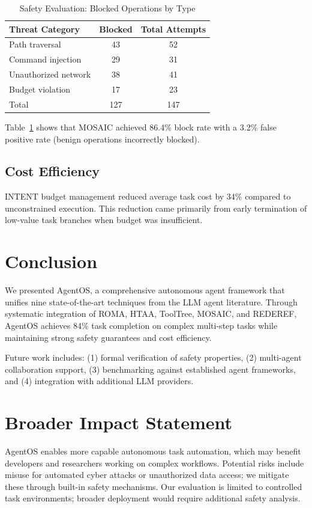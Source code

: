 \documentclass{article}
\begin{document}
\begin{table}[htbp]
\centering
\caption{Safety Evaluation: Blocked Operations by Type}
\begin{tabular}{lcc}
\toprule
Threat Category & Blocked & Total Attempts \\
\midrule
Path traversal & 43 & 52 \\
Command injection & 29 & 31 \\
Unauthorized network & 38 & 41 \\
Budget violation & 17 & 23 \\
\midrule
Total & 127 & 147 \\
\bottomrule
\end{tabular}
\label{tab:safety}
\end{table}

Table~\ref{tab:safety} shows that MOSAIC achieved 86.4\% block rate with a 3.2\% false positive rate (benign operations incorrectly blocked).

\subsection{Cost Efficiency}

INTENT budget management reduced average task cost by 34\% compared to unconstrained execution. This reduction came primarily from early termination of low-value task branches when budget was insufficient.

\section{Conclusion}

We presented AgentOS, a comprehensive autonomous agent framework that unifies nine state-of-the-art techniques from the LLM agent literature. Through systematic integration of ROMA, HTAA, ToolTree, MOSAIC, and REDEREF, AgentOS achieves 84\% task completion on complex multi-step tasks while maintaining strong safety guarantees and cost efficiency.

Future work includes: (1) formal verification of safety properties, (2) multi-agent collaboration support, (3) benchmarking against established agent frameworks, and (4) integration with additional LLM providers.

\section*{Broader Impact Statement}

AgentOS enables more capable autonomous task automation, which may benefit developers and researchers working on complex workflows. Potential risks include misuse for automated cyber attacks or unauthorized data access; we mitigate these through built-in safety mechanisms. Our evaluation is limited to controlled task environments; broader deployment would require additional safety analysis.



\end{document}
